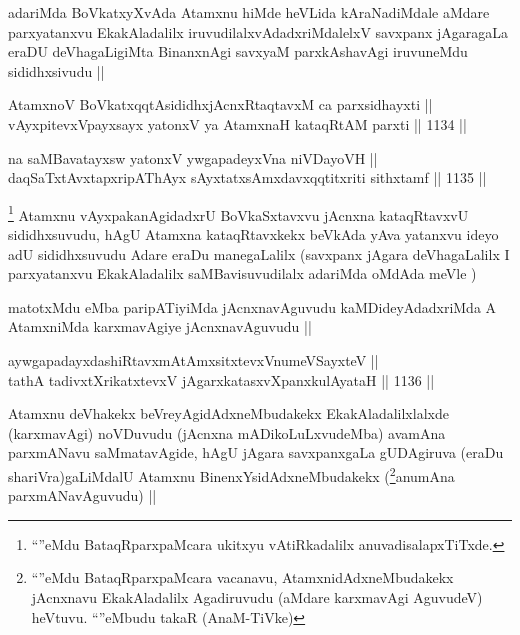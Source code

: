 \begin{artha}
adariMda BoVkatxyXvAda Atamxnu hiMde heVLida kAraNadiMdale aMdare parxyatanxvu EkakAladalilx iruvudilalxvAdadxriMdalelxV savxpanx jAgaragaLa eraDU deVhagaLigiMta BinanxnAgi savxyaM parxkAshavAgi iruvuneMdu sididhxsivudu ||
\end{artha}


\begin{shl}
AtamxnoV BoVkatxqqtAsididhxjAcnxRtaqtavxM ca parxsidhayxti || \\
vAyxpitevxV\s payxsayx yatonxV ya AtamxnaH kataqRtAM parxti ||  1134 ||  
\end{shl}
				
\begin{shl}
na saMBavatayxsw yatonxV ywgapadeyxVna niVDayoVH || \\
daqSaTxtAvxtapxripAThAyx sAyxtatxsAmxdavxqqtitxriti sithxtamf ||  1135 ||  
\end{shl}

\begin{artha}
\footnote{``\stext''eMdu BataqRparxpaMcara ukitxyu vAtiRkadalilx anuvadisalapxTiTxde.}
Atamxnu vAyxpakanAgidadxrU BoVkaSxtavxvu jAcnxna kataqRtavxvU sididhxsuvudu, hAgU Atamxna kataqRtavxkekx beVkAda yAva yatanxvu ideyo adU sididhxsuvudu Adare eraDu manegaLalilx (savxpanx jAgara deVhagaLalilx I parxyatanxvu EkakAladalilx saMBavisuvudilalx adariMda oMdAda meVle )
\end{artha}

\begin{artha}
matotxMdu eMba paripATiyiMda jAcnxnavAguvudu kaMDideyAdadxriMda A AtamxniMda karxmavAgiye jAcnxnavAguvudu ||
\end{artha}

\begin{shl}
aywgapadayxdashiRtavxmAtAmxsitxtevxV\s numeVSayxteV || \\
tathA tadivxtXrikatxtevxV jAgarxkatasxvXpanxkulAyataH ||  1136 ||  
\end{shl}

\begin{artha}
Atamxnu deVhakekx beVreyAgidAdxneMbudakekx EkakAladalilxlalxde (karxmavAgi) noVDuvudu (jAcnxna mADikoLuLxvudeMba) avamAna parxmANavu saMmatavAgide, hAgU jAgara savxpanxgaLa gUDAgiruva (eraDu shariVra)gaLiMdalU Atamxnu BinenxYsidAdxneMbudakekx (\footnote{``\stext''eMdu BataqRparxpaMcara vacanavu, AtamxnidAdxneMbudakekx jAcnxnavu EkakAladalilx Agadiruvudu (aMdare karxmavAgi AguvudeV) heVtuvu. ``\stext''eMbudu takaR (AnaM-TiVke)}anumAna parxmANavAguvudu) ||
\end{artha}

